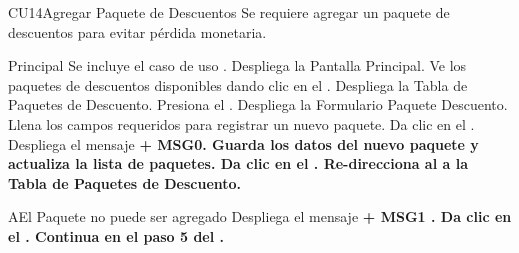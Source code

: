 \begin{UseCase}{CU14}{Agregar Paquete de Descuentos}{
		Se requiere agregar un paquete de descuentos para evitar pérdida monetaria.
	}
	\end{UseCase}
	\begin{UCtrayectoria}{Principal}
		\UCpaso Se incluye el caso de uso .
		\UCpaso Despliega la  {Pantalla Principal}.
		\UCpaso[\UCactor] Ve los paquetes de descuentos disponibles dando clic en el .
		\UCpaso Despliega la  {Tabla de Paquetes de Descuento}.
		\UCpaso[\UCactor] Presiona el .
		\UCpaso Despliega la  {Formulario Paquete Descuento}.
		\UCpaso [\UCactor] Llena los campos requeridos para registrar un nuevo paquete. 
		\UCpaso[\UCactor] Da clic en el  .
		\UCpaso Despliega el mensaje \bf {+ MSG0}. 
		\UCpaso Guarda los datos del nuevo paquete y actualiza la lista de paquetes.
		\UCpaso[\UCactor] Da clic en el .
		\UCpaso Re-direcciona al \UCactor a la  {Tabla de Paquetes de Descuento}.
	\end{UCtrayectoria}


		\begin{UCtrayectoriaA}{A}{El Paquete no puede ser agregado}
			\UCpaso Despliega el mensaje \bf {+ MSG1 }.
			\UCpaso[\UCactor] Da clic en el .
			\UCpaso Continua en el paso 5 del .
		\end{UCtrayectoriaA}

